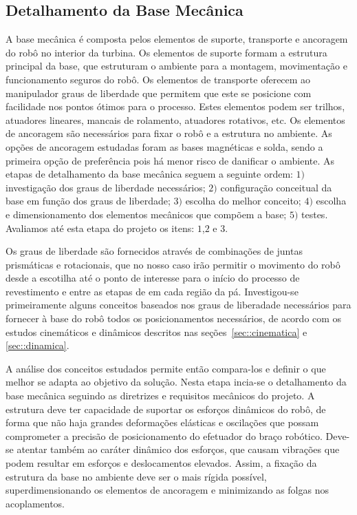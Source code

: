 \subsection{Detalhamento da Base Mecânica}\label{sec::base_mec}
A base mecânica é composta pelos elementos de suporte, transporte e ancoragem do
robô no interior da turbina. Os elementos de suporte formam a estrutura
principal da base, que estruturam o ambiente para a montagem, movimentação e
funcionamento seguros do robô. Os elementos de transporte oferecem ao
manipulador graus de liberdade que permitem que este se posicione com facilidade
nos pontos ótimos para o processo. Estes elementos podem ser trilhos, atuadores
lineares, mancais de rolamento, atuadores rotativos, etc. Os elementos de
ancoragem são necessários para fixar o robô e a estrutura no ambiente. As
opções de ancoragem estudadas foram as bases magnéticas e solda, sendo a
primeira opção de preferência pois há menor risco de danificar o ambiente. As
etapas de detalhamento da base mecânica seguem a seguinte ordem: $1)$ investigação dos
graus de liberdade necessários; $2)$ configuração conceitual da base em função
dos graus de liberdade; $3)$ escolha do melhor conceito; $4)$ escolha e
dimensionamento dos elementos mecânicos que compõem a base; $5)$ testes.
Avaliamos até esta etapa do projeto os itens: $1$,$2$ e $3$.

Os graus de liberdade são fornecidos através de combinações de juntas
prismáticas e rotacionais, que no nosso caso irão permitir o movimento do robô
desde a escotilha até o ponto de interesse para o início do processo de
revestimento e entre as etapas de em cada região da pá.
Investigou-se primeiramente alguns conceitos baseados nos graus de liberadade 
necessários para fornecer à base do robô todos os posicionamentos necessários, 
de acordo com os estudos cinemáticos e dinâmicos descritos  nas
seções~\ref{sec::cinematica} e \ref{sec::dinamica}.

A análise dos conceitos estudados permite então compara-los e definir o que
melhor se adapta ao objetivo da solução. Nesta etapa incia-se o detalhamento da base
mecânica seguindo as diretrizes e requisitos mecânicos do projeto. A
estrutura deve ter capacidade de suportar os esforços dinâmicos do robô,
de forma que não haja grandes deformações elásticas e oscilações que possam
comprometer a precisão de posicionamento do efetuador do braço robótico.
Deve-se atentar também ao caráter dinâmico dos esforços, que causam vibrações
que podem resultar em esforços e deslocamentos elevados.
Assim, a fixação da estrutura da base no ambiente deve ser o mais rígida
possível, superdimensionando os elementos de ancoragem e minimizando as folgas
nos acoplamentos.

